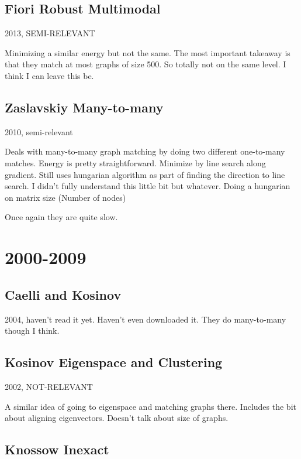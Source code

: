 \documentclass{article}[11pt]
\begin{document}
\subsection{Fiori Robust Multimodal \cite{NIPS2013_4925}}

2013, SEMI-RELEVANT

Minimizing a similar energy but not the same. The most important takeaway is that they match at most graphs of size 500. So totally not on the same level. I think I can leave this be.

\subsection{Zaslavskiy Many-to-many \cite{Zaslavskiy2010}}

2010, semi-relevant

Deals with many-to-many graph matching by doing two different one-to-many matches. Energy is pretty straightforward. Minimize by line search along gradient. Still uses hungarian algorithm as part of finding the direction to line search. I didn't fully understand this little bit but whatever. Doing a hungarian on matrix size (Number of nodes)

Once again they are quite slow.
    
\section{2000-2009}

\subsection{Caelli and Kosinov \cite{Caelli2004}}

2004, haven't read it yet. Haven't even downloaded it. They do many-to-many though I think.

\subsection{Kosinov Eigenspace and Clustering \cite{Kosinov2002}}

2002, NOT-RELEVANT

A similar idea of going to eigenspace and matching graphs there. Includes the bit about aligning eigenvectors. Doesn't talk about size of graphs.

\subsection{Knossow Inexact \cite{Knossow2009}}
\end{document}
